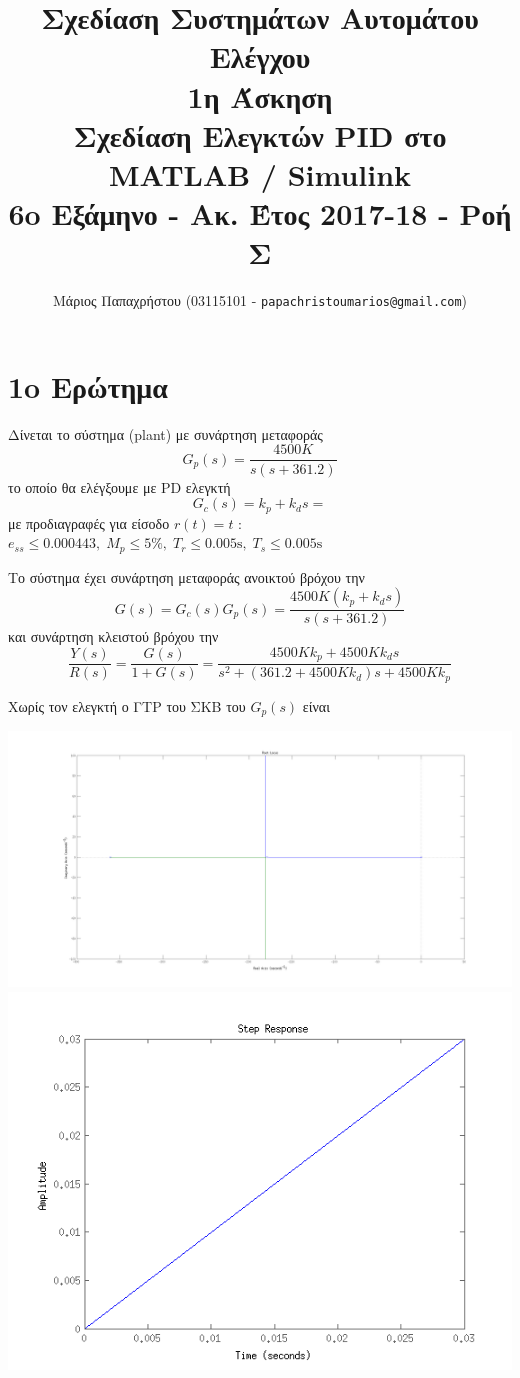 \documentclass[a4paper,oneside, 10pt]{article}
\title{\textbf{Σχεδίαση Συστημάτων Αυτομάτου Ελέγχου} \\ 1η Άσκηση \\ \large{Σχεδίαση Ελεγκτών PID στο MATLAB / Simulink} \\ \small 6o Εξάμηνο - Ακ. Έτος 2017-18 - Ροή Σ}
\author{Μάριος Παπαχρήστου (03115101 - \texttt{papachristoumarios@gmail.com}) }
\date{\hrule}
\begin{document}
\maketitle

\section*{1o Ερώτημα} 

Δίνεται το σύστημα (plant) με συνάρτηση μεταφοράς $$G_p (s) = \frac {4500K} {s(s + 361.2)}$$ το οποίο θα ελέγξουμε με PD ελεγκτή $$G_c(s) = k_p + k_d s = $$ με προδιαγραφές για είσοδο $r(t) = t $ : $e_{ss} \le 0.000443, \; M_p \le 5 \%, \; T_r \le 0.005 \mathrm s, \; T_s \le 0.005 \mathrm s$

Το σύστημα έχει συνάρτηση μεταφοράς ανοικτού βρόχου την $$G(s) = G_c(s) G_p(s) = 
\frac { 4500K (k_p + k_d s) }  {s (s + 361.2) } $$ και συνάρτηση κλειστού βρόχου την 
$$\frac {Y(s)} {R(s)} = \frac {G(s)} {1 + G(s)} = \frac {4500 K k_p +  4500 K k_ds} {s^2 + (361.2 + 4500Kk_d)s + 4500 K k_p  }$$


Χωρίς τον ελεγκτή ο ΓΤΡ του ΣΚΒ του $G_p(s)$ είναι 

\includegraphics[width=\textwidth]{plant_rlocus.png}
\includegraphics[width=\textwidth]{step1.png}
\end{document}
